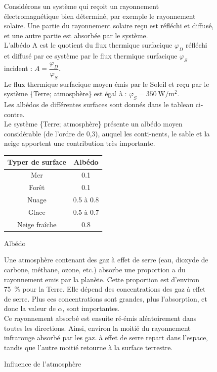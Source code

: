 \documentclass[a4paper,11pt,fleqn]{article}%
\begin{document}
\begin{figure}[h!]
	\caption{Albédo}
	\begin{minipage}{.68\linewidth}
		Considérons un système qui reçoit un rayonnement électromagnétique bien déterminé, par exemple le rayonnement solaire. Une partie du rayonnement solaire reçu est réfléchi et diffusé, et une autre partie est absorbée par le système.\\
		L'albédo A est le quotient du flux thermique surfacique $\varphi_D$ réfléchi et diffusé par ce système par le flux thermique surfacique $\varphi_S$ incident : $A = \dfrac{\varphi_D}{\varphi_S}$.\\
		Le flux thermique surfacique moyen émis par le Soleil et reçu par le système \{Terre; atmosphère\} est égal
		à : $\varphi_S = \SI{350} {\watt\per\meter\squared}$.\\
		Les albédos de différentes surfaces sont donnés dans le tableau ci-contre.\\
		Le système \{Terre; atmosphère\} présente un albédo moyen considérable (de l'ordre de 0,3), auquel les conti-nents, le sable et la neige apportent une contribution très importante.
	\end{minipage} 
	\begin{minipage}{.3\linewidth}
		\begin{tabular}{|c|c|}
			\hline
			\textbf{Typer de surface} & \textbf{Albédo}\\
			\hline
			Mer & \num{0,1}\\
			\hline
			Forêt & \num{0,1}\\
			\hline
			Nuage & \num{0,5} à \num{0,8}\\
			\hline
			Glace & \num{0,5} à \num{0,7}\\
			\hline
			Neige fraîche & \num{0,8}\\
			\hline
		\end{tabular}
	\end{minipage}
\end{figure}

\begin{figure}[h!]
	\caption{Influence de l'atmosphère}
	Une atmosphère contenant des gaz à effet de serre (eau, dioxyde de carbone, méthane, ozone, etc.) absorbe une proportion a du rayonnement emis par la planète. Cette proportion est d'environ \SI{75}{\percent} pour la Terre. Elle dépend des concentrations des gaz à effet de serre. Plus ces concentrations sont grandes, plus l'absorption, et donc la valeur de $\alpha$, sont importantes.\\
	Ce rayonnement absorbé est ensuite ré-émis aléatoirement dans toutes les directions. Ainsi, environ la moitié du rayonnement infrarouge absorbé par les gaz. à effet de serre repart dans l'espace, tandis que l'autre moitié retourne à la surface terrestre.
\end{figure}
\end{document}
